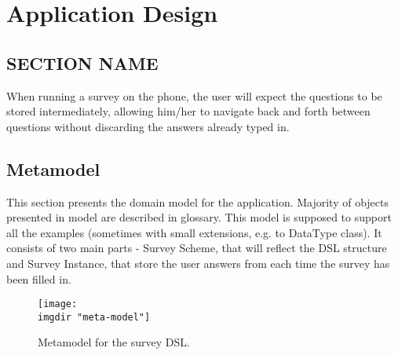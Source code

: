 \chapter{Application Design}
\label{chap:design}

\section{SECTION NAME}
\label{sec:}
When running a survey on the phone, the user will expect the questions to be stored intermediately, allowing him/her to navigate back and forth between questions without discarding the answers already typed in.

\begin{center}
 \hspace{10mm}
\end{center}


\section{Metamodel}
\label{sec:metamodel}
This section presents the domain model for the application. Majority of objects presented in model are described in glossary. This model is supposed to support all the examples (sometimes with small extensions, e.g. to DataType class). It consists of two main parts - Survey Scheme, that will reflect the DSL structure and Survey Instance, that store the user answers from each time the survey has been filled in.

\begin{figure}
  \texttt{[image: \\imgdir "meta-model"]}
  \caption{Metamodel for the survey DSL.}
  \label{fig:metamodel}
\end{figure}

